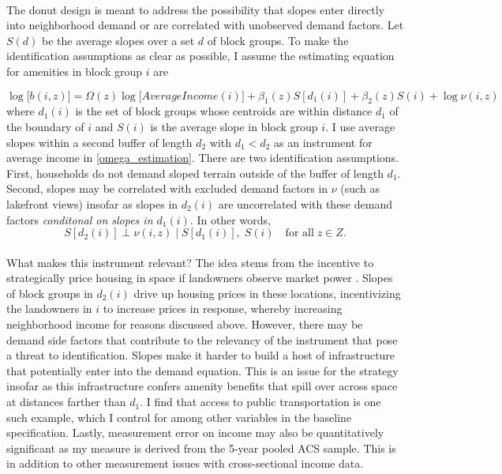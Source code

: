 \documentclass[11pt]{article}
\begin{document}
\paragraph*{}
The donut design is meant to address the possibility that slopes enter directly into neighborhood demand or are correlated with unobserved demand factors. Let $S(d)$ be the average slopes over a set $d$ of block groups. To make the identification assumptions as clear as possible, I assume the estimating equation for amenities in block group $i$ are

\begin{equation}\label{omega_estimation}
		\log\big[b(i, z)\big] = \Omega(z)\log\bigg[AverageIncome(i)\bigg] + \beta_{1}(z)S[d_{1}(i)] + \beta_{2}(z)S(i) + \log \nu(i, z)
\end{equation}
where $d_{1}(i)$ is the set of block groups whose centroids are within distance $d_{1}$ of the boundary of $i$ and $S(i)$ is the average slope in block group $i$. I use average slopes within a second buffer of length $d_{2}$ with $d_{1} < d_{2}$ as an instrument for average income in \eqref{omega_estimation}. There are two identification assumptions. First, households do not demand sloped terrain outside of the buffer of length $d_{1}$. Second, slopes may be correlated with excluded demand factors in $\nu$ (such as lakefront views) insofar as slopes in $d_{2}(i)$ are uncorrelated with these demand factors \textit{conditonal on slopes in $d_{1}(i)$}. In other words,
\begin{equation}
	S[d_{2}(i)] \perp \nu(i, z) \; | \; S[d_{1}(i)], \; S(i) \quad \text{for all} \; z \in Z.
\end{equation}

\paragraph*{}
What makes this instrument relevant? The idea stems from the incentive to strategically price housing in space if landowners observe market power \citep{BFMJPE, anagoletal2021}. Slopes of block groups in $d_{2}(i)$ drive up housing prices in these locations, incentivizing the landowners in $i$ to increase prices in response, whereby increasing neighborhood income for reasons discussed above. However, there may be demand side factors that contribute to the relevancy of the instrument that pose a threat to identification. Slopes make it harder to build a host of infrastructure that potentially enter into the demand equation. This is an issue for the strategy insofar as this infrastructure confers amenity benefits that spill over across space at distances farther than $d_{1}$. I find that access to public transportation is one such example, which I control for among other variables in the baseline specification. Lastly, measurement error on income may also be quantitatively significant as my measure is derived from the 5-year pooled ACS sample. This is in addition to other measurement issues with cross-sectional income data. 
\end{document}
